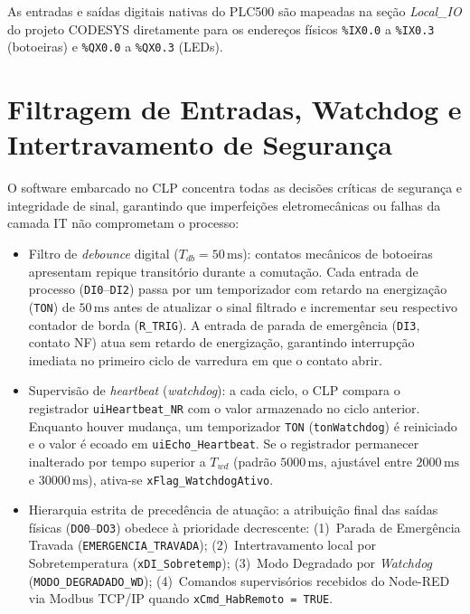 As entradas e saídas digitais nativas do PLC500 são mapeadas na seção \textit{Local\_IO} do projeto CODESYS diretamente para os endereços físicos \texttt{\%IX0.0} a \texttt{\%IX0.3} (botoeiras) e \texttt{\%QX0.0} a \texttt{\%QX0.3} (LEDs).

\section{Filtragem de Entradas, Watchdog e Intertravamento de Segurança}
\label{sec:clp_seguranca}

O software embarcado no CLP concentra todas as decisões críticas de segurança e integridade de sinal, garantindo que imperfeições eletromecânicas ou falhas da camada IT não comprometam o processo:

\begin{itemize}
  \item Filtro de \textit{debounce} digital ($T_{db} = 50\,\text{ms}$): contatos mecânicos de botoeiras apresentam repique transitório durante a comutação. Cada entrada de processo (\texttt{DI0}--\texttt{DI2}) passa por um temporizador com retardo na energização (\texttt{TON}) de $50\,\text{ms}$ antes de atualizar o sinal filtrado e incrementar seu respectivo contador de borda (\texttt{R\_TRIG}). A entrada de parada de emergência (\texttt{DI3}, contato NF) atua sem retardo de energização, garantindo interrupção imediata no primeiro ciclo de varredura em que o contato abrir.
  \item Supervisão de \textit{heartbeat} (\textit{watchdog}): a cada ciclo, o CLP compara o registrador \texttt{uiHeartbeat\_NR} com o valor armazenado no ciclo anterior. Enquanto houver mudança, um temporizador \texttt{TON} (\texttt{tonWatchdog}) é reiniciado e o valor é ecoado em \texttt{uiEcho\_Heartbeat}. Se o registrador permanecer inalterado por tempo superior a $T_{wd}$ (padrão $5000\,\text{ms}$, ajustável entre $2000\,\text{ms}$ e $30000\,\text{ms}$), ativa-se \texttt{xFlag\_WatchdogAtivo}.
  \item Hierarquia estrita de precedência de atuação: a atribuição final das saídas físicas (\texttt{DO0}--\texttt{DO3}) obedece à prioridade decrescente: (1)~Parada de Emergência Travada (\texttt{EMERGENCIA\_TRAVADA}); (2)~Intertravamento local por Sobretemperatura (\texttt{xDI\_Sobretemp}); (3)~Modo Degradado por \textit{Watchdog} (\texttt{MODO\_DEGRADADO\_WD}); (4)~Comandos supervisórios recebidos do Node-RED via Modbus TCP/IP quando \texttt{xCmd\_HabRemoto = TRUE}.
\end{itemize}

